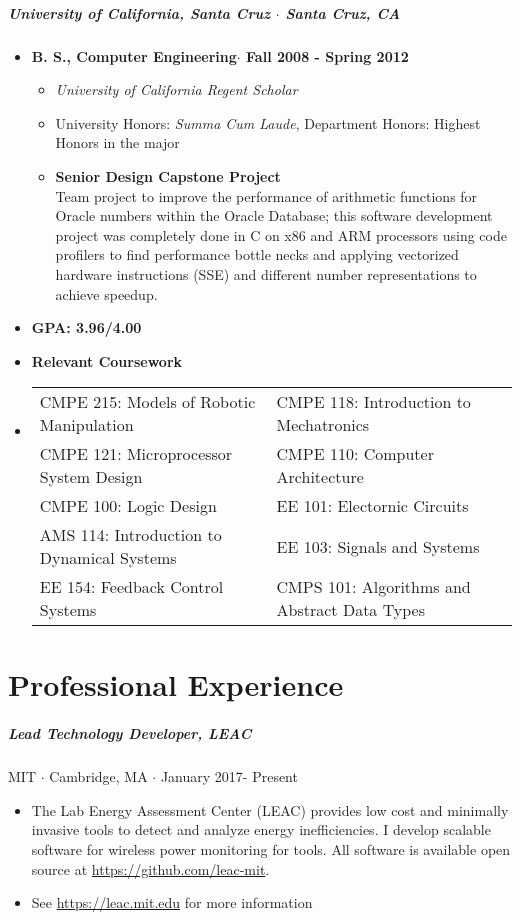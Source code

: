 \documentclass[10pt,letterpaper]{article}
\begin{document}
\subparagraph{University of California, Santa Cruz $\cdot$ Santa Cruz, CA }
\begin{itemize}
    \item {\bf B. S., Computer Engineering$\cdot$ Fall 2008 - Spring 2012}
    \begin{itemize}
		\item {\em University of California Regent Scholar} 
		\item University Honors: {\em Summa Cum Laude}, Department Honors: Highest Honors in the major

        \item {\bf Senior Design Capstone Project}\\
        Team project to improve the performance of arithmetic functions for Oracle numbers within the Oracle Database; this software development project was completely done in C on x86 and ARM processors using code profilers to find performance bottle necks and applying vectorized hardware instructions (SSE) and different number representations to achieve speedup. 
    \end{itemize}
\end{itemize}

\begin{itemize}
    \item {\bf GPA: 3.96/4.00 }
    \item {\bf Relevant Coursework}
    \item
    \begin{tabularx}{\textwidth}{l l}
        CMPE 215: Models of Robotic Manipulation 
        & \hfill CMPE 118: Introduction to Mechatronics \\
        CMPE 121: Microprocessor System Design 
        & \hfill CMPE 110: Computer Architecture \\
        CMPE 100: Logic Design 
        & \hfill EE 101: Electornic Circuits \\
         AMS 114: Introduction to Dynamical Systems 
        & \hfill EE 103: Signals and Systems \\
        EE 154: Feedback Control Systems 
        & \hfill CMPS 101: Algorithms and Abstract Data Types\\
    \end{tabularx}
\end{itemize}



\section*{Professional Experience}
\subparagraph{Lead Technology Developer, LEAC} MIT $\cdot$ Cambridge, MA $\cdot$ January 2017- Present
\begin{itemize}
    \item The Lab Energy Assessment Center (LEAC) provides low cost and minimally invasive tools to detect and analyze energy inefficiencies. I develop scalable software for wireless power monitoring for tools. All software is available open source at \url{https://github.com/leac-mit}.
\item See \url{https://leac.mit.edu} for more information
\end{itemize}
\end{document}
